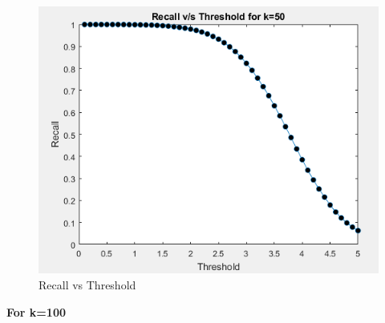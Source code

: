 \documentclass[12pt, onecolumn]{IEEEtran}
\begin{document}
\begin{figure}[h!]
\centering
\captionsetup{justification=centering}
\includegraphics[scale=0.59]{Graphs/3-8}
\caption{Recall vs Threshold}
\end{figure}
\newpage
\textbf{For k=100}
\end{document}
